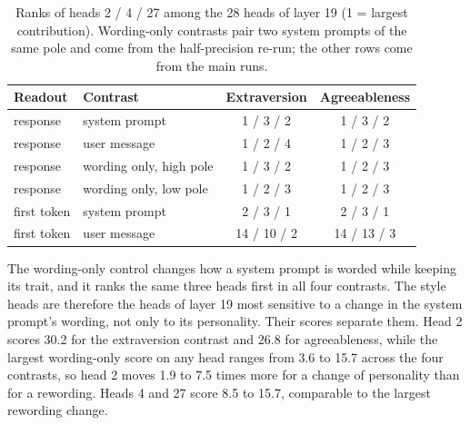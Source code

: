 \begin{table}[t]
\centering
\small
\begin{tabular}{@{}llcc@{}}
\toprule
Readout & Contrast & Extraversion & Agreeableness \\
\midrule
response & system prompt & 1 / 3 / 2 & 1 / 3 / 2 \\
response & user message & 1 / 2 / 4 & 1 / 2 / 3 \\
response & wording only, high pole & 1 / 3 / 2 & 1 / 2 / 3 \\
response & wording only, low pole & 1 / 2 / 3 & 1 / 2 / 3 \\
first token & system prompt & 2 / 3 / 1 & 2 / 3 / 1 \\
first token & user message & 14 / 10 / 2 & 14 / 13 / 3 \\
\bottomrule
\end{tabular}
\caption{Ranks of heads 2 / 4 / 27 among the 28 heads of layer 19 (1 = largest contribution). Wording-only contrasts pair two system prompts of the same pole and come from the half-precision re-run; the other rows come from the main runs.}
\label{tab:ranks}
\end{table}

The wording-only control changes how a system prompt is worded while keeping its trait, and it ranks the same three heads first in all four contrasts. The style heads are therefore the heads of layer 19 most sensitive to a change in the system prompt's wording, not only to its personality. Their scores separate them. Head 2 scores 30.2 for the extraversion contrast and 26.8 for agreeableness, while the largest wording-only score on any head ranges from 3.6 to 15.7 across the four contrasts, so head 2 moves 1.9 to 7.5 times more for a change of personality than for a rewording. Heads 4 and 27 score 8.5 to 15.7, comparable to the largest rewording change.

